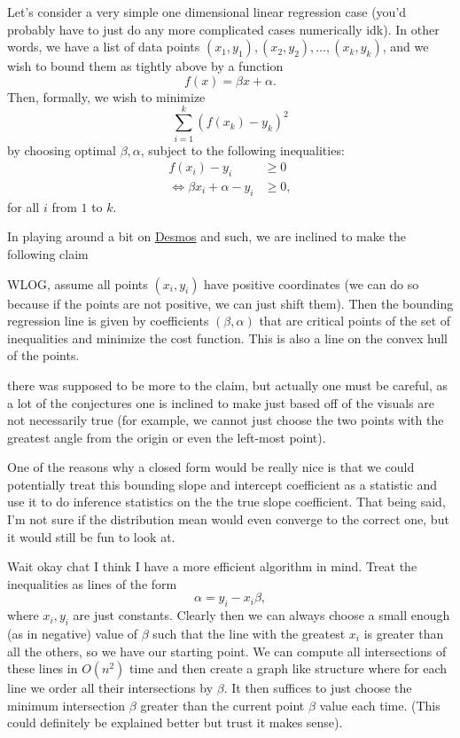 \documentclass[a4paper, 12pt]{article}
\begin{document}
Let's consider a very simple one dimensional linear regression case (you'd probably have to just do any more complicated cases numerically idk). In other words, we have a list of data points \( (x_1, y_1), (x_2, y_2), \ldots, (x_k, y_k) \), and we wish to bound them as tightly above by a function
\[
    f(x) = \beta x + \alpha
.\]
Then, formally, we wish to minimize
\[
    \sum_{i = 1}^{k} (f(x_k) - y_k)^2
\]
by choosing optimal \( \beta, \alpha \), subject to the following inequalities:
\begin{align*}
    f(x_i) - y_i &\ge 0 \\
    \iff \beta x_i + \alpha - y_i &\ge 0
,\end{align*}
for all \( i \) from \( 1 \) to \( k \).

In playing around a bit on \href{https://www.desmos.com/calculator/3xkwu2ijmq}{Desmos} and such, we are inclined to make the following claim

\begin{claim}
    WLOG, assume all points \( (x_i, y_i) \) have positive coordinates (we can do so because if the points are not positive, we can just shift them). Then the bounding regression line is given by coefficients \( (\beta, \alpha) \) that are critical points of the set of inequalities and minimize the cost function. This is also a line on the convex hull of the points.
\end{claim}

there was supposed to be more to the claim, but actually one must be careful, as a lot of the conjectures one is inclined to make just based off of the visuals are not necessarily true (for example, we cannot just choose the two points with the greatest angle from the origin or even the left-most point).

One of the reasons why a closed form would be really nice is that we could potentially treat this bounding slope and intercept coefficient as a statistic and use it to do inference statistics on the the true slope coefficient. That being said, I'm not sure if the distribution mean would even converge to the correct one, but it would still be fun to look at.

Wait okay chat I think I have a more efficient algorithm in mind. Treat the inequalities as lines of the form
\[
    \alpha = y_i - x_i \beta 
,\]
where \( x_i, y_i \) are just constants. Clearly then we can always choose a small enough (as in negative) value of \( \beta \) such that the line with the greatest \( x_i \) is greater than all the others, so we have our starting point. We can compute all intersections of these lines in \( O(n^2) \) time and then create a graph like structure where for each line we order all their intersections by \( \beta \). It then suffices to just choose the minimum intersection \( \beta \) greater than the current point \( \beta \) value each time. (This could definitely be explained better but trust it makes sense).
\end{document}
